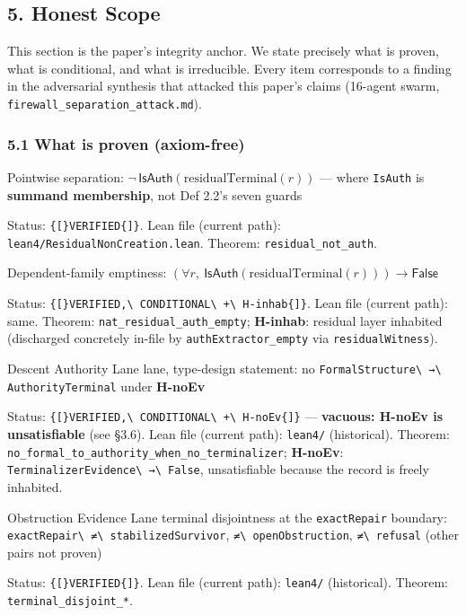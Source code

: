 \documentclass[
  10pt,
]{article}
\DeclareRobustCommand{\texttt}[1]{{\paperSymbolFont\nolinkurl{#1}}}
\begin{document}
\subsection{5. Honest Scope}\label{honest-scope}

This section is the paper's integrity anchor. We state precisely what is proven, what is conditional, and what is irreducible. Every item corresponds to a finding in the adversarial synthesis that attacked this paper's claims (16-agent swarm, \texttt{firewall\_separation\_attack.md}).

\subsubsection{5.1 What is proven (axiom-free)}\label{what-is-proven-axiom-free}

Pointwise separation: \protect\hypertarget{math-E0044-0109}{}{\(\neg\,\mathsf{IsAuth}(\mathrm{residualTerminal}(r))\)} --- where \texttt{IsAuth} is \textbf{summand membership}, not Def 2.2's seven guards

Status: \texttt{{[}VERIFIED{]}}. Lean file (current path): \texttt{lean4/ResidualNonCreation.lean}. Theorem: \texttt{residual\_not\_auth}.

Dependent-family emptiness: \protect\hypertarget{math-E0077-0110}{}{\((\forall r,\ \mathsf{IsAuth}(\mathrm{residualTerminal}(r))) \to \mathsf{False}\)}

Status: \texttt{{[}VERIFIED,\ CONDITIONAL\ +\ H-inhab{]}}. Lean file (current path): same. Theorem: \texttt{nat\_residual\_auth\_empty}; \textbf{H-inhab}: residual layer inhabited (discharged concretely in-file by \texttt{authExtractor\_empty} via \texttt{residualWitness}).

Descent Authority Lane lane, type-design statement: no \texttt{FormalStructure\ →\ AuthorityTerminal} under \textbf{H-noEv}

Status: \texttt{{[}VERIFIED,\ CONDITIONAL\ +\ H-noEv{]}} --- \textbf{vacuous: H-noEv is unsatisfiable} (see §3.6). Lean file (current path): \texttt{lean4/} (historical). Theorem: \texttt{no\_formal\_to\_authority\_when\_no\_terminalizer}; \textbf{H-noEv}: \texttt{TerminalizerEvidence\ →\ False}, unsatisfiable because the record is freely inhabited.

Obstruction Evidence Lane terminal disjointness at the \texttt{exactRepair} boundary: \texttt{exactRepair\ ≠\ stabilizedSurvivor}, \texttt{≠\ openObstruction}, \texttt{≠\ refusal} (other pairs not proven)

Status: \texttt{{[}VERIFIED{]}}. Lean file (current path): \texttt{lean4/} (historical). Theorem: \texttt{terminal\_disjoint\_*}.
\end{document}
